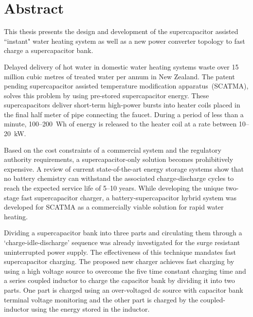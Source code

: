 
\chapter*{Abstract}

This thesis presents the design and development of the supercapacitor assisted ``instant" water heating system as well as a new power converter topology to fast charge a supercapacitor bank.

 Delayed delivery of hot water in domestic water heating systems waste over 15 million cubic metres of treated water per annum in New Zealand. The patent pending supercapacitor assisted temperature modification apparatus~(SCATMA), solves this problem by using pre-stored supercapacitor energy. These supercapacitors deliver short-term high-power bursts into heater coils placed in the final half meter of pipe connecting the faucet.  During a period of less than a minute, 100--200~Wh of energy is released to the heater coil at a rate between 10--20~kW.


Based on the cost constraints of a commercial system and the regulatory authority requirements, a supercapacitor-only solution becomes prohibitively expensive. A review of current state-of-the-art energy storage systems show that no battery chemistry can withstand the associated charge-discharge cycles to reach the expected service life of 5--10 years. While developing the unique two-stage fast supercapacitor charger, a battery-supercapacitor hybrid system was developed for SCATMA as a commercially viable solution for rapid water heating.   
 
Dividing a supercapacitor bank into three parts and circulating them through a `charge-idle-discharge' sequence was already investigated for the surge resistant uninterrupted power supply. The effectiveness of this technique mandates fast supercapacitor charging. The proposed new charger achieves fast charging by using a high voltage source to overcome the five time constant charging time and a series coupled inductor to charge the  capacitor bank by dividing it into two parts. One part is charged using an over-voltaged dc source with capacitor bank terminal voltage monitoring and the other part is charged by the coupled-inductor using the energy stored in the inductor.

 





